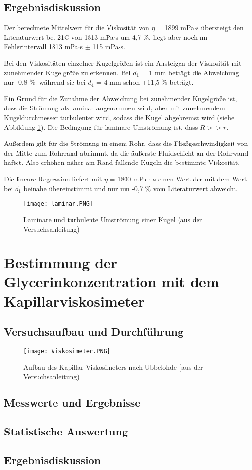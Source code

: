 \documentclass{scrartcl}
\begin{document}
\subsection{Ergebnisdiskussion}
Der berechnete Mittelwert für die Viskosität von $\eta$ = 1899 mPa$\cdot$s übersteigt den Literaturwert bei 21\degree C von 1813 mPa$\cdot$s um 4,7 \%, liegt aber noch im Fehlerintervall 1813 mPa$\cdot$s $\pm$ 115 mPa$\cdot$s. 

Bei den Viskositäten einzelner Kugelgrößen ist ein Ansteigen der Viskosität mit zunehmender Kugelgröße zu erkennen. Bei $d_{1}$ = 1 mm beträgt die Abweichung nur -0,8 \%, während sie bei $d_{4}$ = 4 mm schon +11,5 \% beträgt.

Ein Grund für die Zunahme der Abweichung bei zunehmender Kugelgröße ist, dass die Strömung als laminar angenommen wird, aber mit zunehmendem Kugeldurchmesser turbulenter wird, sodass die Kugel abgebremst wird (siehe Abbildung \ref{fig:laminar}). Die Bedingung für laminare Umströmung ist, dass $R >> r$.

Außerdem gilt für die Strömung in einem Rohr, dass die Fließgeschwindigkeit von der Mitte zum Rohrrand abnimmt, da die äußerste Fluidschicht an der Rohrwand haftet. Also erhöhen näher am Rand fallende Kugeln die bestimmte Viskosität.

Die lineare Regression liefert mit $\eta$ = 1800 mPa $\cdot$ s einen Wert der mit dem Wert bei $d_{1}$ beinahe übereinstimmt und nur um -0,7 \% vom Literaturwert abweicht.

\begin{figure}[H]
  \centering
    \texttt{[image: laminar.PNG]}
  \caption{Laminare und turbulente Umströmung einer Kugel (aus der Versuchsanleitung)}
  \label{fig:laminar}
\end{figure}




\pagebreak
\section{Bestimmung der Glycerinkonzentration mit dem Kapillarviskosimeter}
\subsection{Versuchsaufbau und Durchführung}
\begin{figure}[H]
  \centering
    \texttt{[image: Viskosimeter.PNG]}
  \caption{Aufbau des Kapillar-Viskosimeters nach Ubbelohde (aus der Versuchsanleitung)}
  \label{fig:Viskosimeter}
\end{figure}
\subsection{Messwerte und Ergebnisse}
\subsection{Statistische Auswertung}
\subsection{Ergebnisdiskussion}
\end{document}
